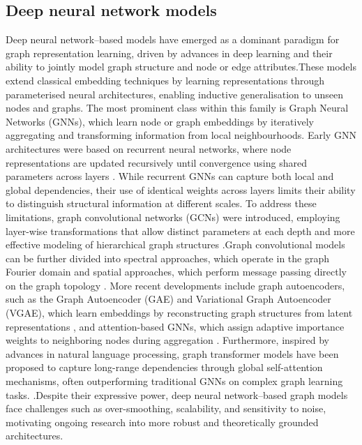 \subsection{ Deep neural network models}
Deep neural network–based models have emerged as a dominant paradigm for graph representation learning, driven by advances in deep learning and their ability to jointly model graph structure and node or edge attributes.These models extend classical embedding techniques by learning representations through parameterised neural architectures, enabling inductive generalisation to unseen nodes and graphs. The most prominent class within this family is Graph Neural Networks (GNNs), which learn node or graph embeddings by iteratively aggregating and transforming information from local neighbourhoods. Early GNN architectures were based on recurrent neural networks, where node representations are updated recursively until convergence using shared parameters across layers \citep{li2016ggnn,selsam2019sat,tonshoff2023csp}. While recurrent GNNs can capture both local and global dependencies, their use of identical weights across layers limits their ability to distinguish structural information at different scales. To address these limitations, graph convolutional networks (GCNs) were introduced, employing layer-wise transformations that allow distinct parameters at each depth and more effective modeling of hierarchical graph structures \citep{kipf2017semi}.Graph convolutional models can be further divided into spectral approaches, which operate in the graph Fourier domain \citep{bruna2014spectral,defferrard2016cnn}  and spatial approaches, which perform message passing directly on the graph topology \citep{hamilton2017graphsage, velivckovic2018gat, xu2019powerful} . More recent developments include graph autoencoders, such as the Graph Autoencoder (GAE) and Variational Graph Autoencoder (VGAE), which learn embeddings by reconstructing graph structures from latent representations \citep{kipf2016vgae}, and attention-based GNNs, which assign adaptive importance weights to neighboring nodes during aggregation 
\citep{velivckovic2018gat}.
 Furthermore, inspired by advances in natural language processing, graph transformer models have been proposed to capture long-range dependencies through global self-attention mechanisms, often outperforming traditional GNNs on complex graph learning tasks. \citep{dwivedi2021graph, ying2021transformers, kreuzer2021rethinking, rampavsek2022recipe}.Despite their expressive power, deep neural network–based graph models face challenges such as over-smoothing, scalability, and sensitivity to noise, motivating ongoing research into more robust and theoretically grounded architectures. \citep{oono2019graph}

